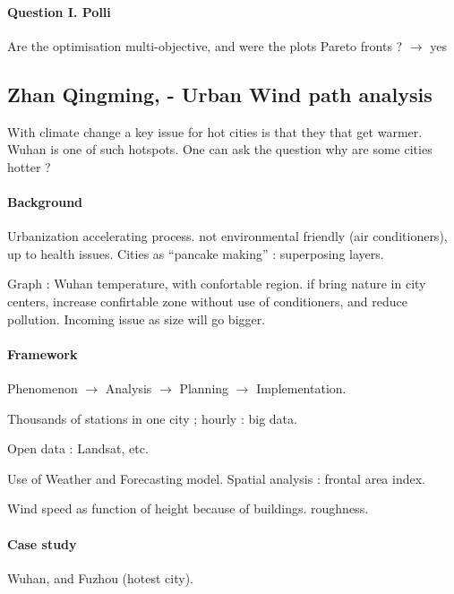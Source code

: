 \documentclass[11pt]{article}
\begin{document}
\paragraph{Question I. Polli}

Are the optimisation multi-objective, and were the plots Pareto fronts ? $\rightarrow$ yes





\subsection*{Zhan Qingming,  - Urban Wind path analysis}

With climate change a key issue for hot cities is that they that get warmer. Wuhan is one of such hotspots. One can ask the question why are some cities hotter ?

\paragraph{Background}

Urbanization accelerating process. not environmental friendly (air conditioners), up to health issues. Cities as ``pancake making'' : superposing layers.

Graph : Wuhan temperature, with confortable region. if bring nature in city centers, increase confirtable zone without use of conditioners, and reduce pollution. Incoming issue as size will go bigger.

\paragraph{Framework}

Phenomenon $\rightarrow$ Analysis $\rightarrow$ Planning $\rightarrow$ Implementation.

Thousands of stations in one city ; hourly : big data.

Open data : Landsat, etc.

Use of Weather and Forecasting model. Spatial analysis : frontal area index.

Wind speed as function of height because of buildings. roughness.

\paragraph{Case study}

Wuhan, and Fuzhou (hotest city).
\end{document}
